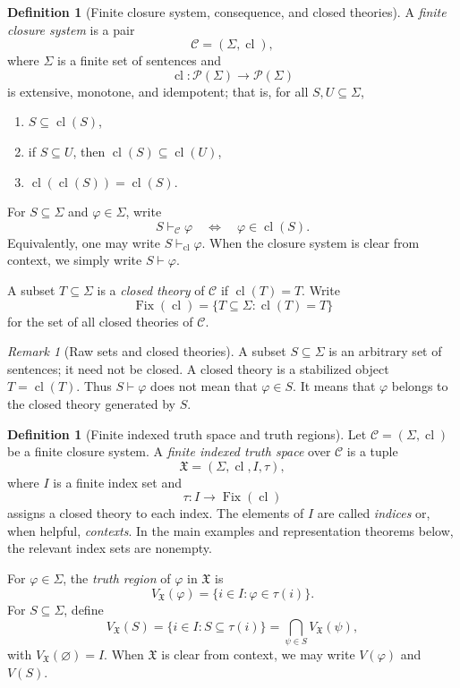 \documentclass[11pt]{amsart}
\numberwithin{equation}{section}
\theoremstyle{plain}
\theoremstyle{definition}
\newtheorem{definition}[theorem]{Definition}
\theoremstyle{remark}
\newtheorem{remark}[theorem]{Remark}
\newcommand{\Pow}{\mathcal P}
\newcommand{\Cl}{\operatorname{cl}}
\newcommand{\Fix}{\operatorname{Fix}}
\newcommand{\C}{\mathcal C}
\newcommand{\X}{\mathfrak X}
\newcommand{\Sig}{\Sigma}
\begin{document}
\begin{definition}[Finite closure system, consequence, and closed theories]
A \emph{finite closure system} is a pair
\[
  \C=(\Sig,\Cl),
\]
where \(\Sig\) is a finite set of sentences and
\[
  \Cl:\Pow(\Sig)\to\Pow(\Sig)
\]
is extensive, monotone, and idempotent; that is, for all \(S,U\subseteq\Sig\),
\begin{enumerate}[label=(\roman*)]
  \item \(S\subseteq\Cl(S)\),
  \item if \(S\subseteq U\), then \(\Cl(S)\subseteq\Cl(U)\),
  \item \(\Cl(\Cl(S))=\Cl(S)\).
\end{enumerate}
For \(S\subseteq\Sig\) and \(\varphi\in\Sig\), write
\[
  S\vdash_{\C}\varphi
  \quad\Longleftrightarrow\quad
  \varphi\in\Cl(S).
\]
Equivalently, one may write \(S\vdash_{\Cl}\varphi\).  When the closure system is clear from context, we simply write \(S\vdash\varphi\).

A subset \(T\subseteq\Sig\) is a \emph{closed theory} of \(\C\) if \(\Cl(T)=T\).  Write
\[
  \Fix(\Cl)=\{T\subseteq\Sig: \Cl(T)=T\}
\]
for the set of all closed theories of \(\C\).
\end{definition}

\begin{remark}[Raw sets and closed theories]
A subset \(S\subseteq\Sig\) is an arbitrary set of sentences; it need not be closed. A closed theory is a stabilized object \(T=\Cl(T)\). Thus \(S\vdash\varphi\) does not mean that \(\varphi\in S\). It means that \(\varphi\) belongs to the closed theory generated by \(S\).
\end{remark}

\begin{definition}[Finite indexed truth space and truth regions]
Let \(\C=(\Sig,\Cl)\) be a finite closure system. A \emph{finite indexed truth space} over \(\C\) is a tuple
\[
  \X=(\Sig,\Cl,I,\tau),
\]
where \(I\) is a finite index set and
\[
  \tau:I\to\Fix(\Cl)
\]
assigns a closed theory to each index.  The elements of \(I\) are called \emph{indices} or, when helpful, \emph{contexts}. In the main examples and representation theorems below, the relevant index sets are nonempty.

For \(\varphi\in\Sig\), the \emph{truth region} of \(\varphi\) in \(\X\) is
\[
  V_{\X}(\varphi)=\{i\in I:\varphi\in\tau(i)\}.
\]
For \(S\subseteq\Sig\), define
\[
  V_{\X}(S)=\{i\in I:S\subseteq\tau(i)\}
  =\bigcap_{\psi\in S}V_{\X}(\psi),
\]
with \(V_{\X}(\varnothing)=I\).  When \(\X\) is clear from context, we may write \(V(\varphi)\) and \(V(S)\).
\end{definition}
\end{document}
